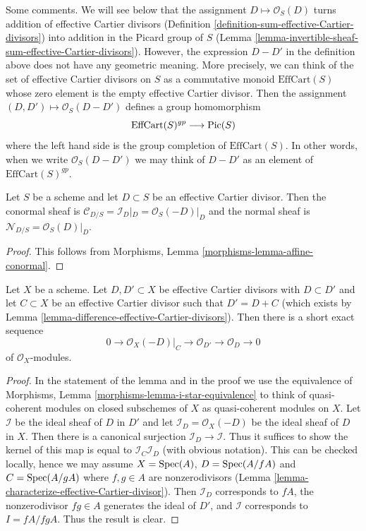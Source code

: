 \noindent
Some comments. We will see below that the assignment
$D \mapsto \mathcal{O}_S(D)$ turns addition of effective Cartier
divisors (Definition \ref{definition-sum-effective-Cartier-divisors})
into addition in the Picard group of $S$
(Lemma \ref{lemma-invertible-sheaf-sum-effective-Cartier-divisors}).
However, the expression $D - D'$ in the definition above does not
have any geometric meaning. More precisely, we can think of the
set of effective Cartier divisors on $S$ as a commutative monoid
$\text{EffCart}(S)$ whose zero element is the empty effective Cartier divisor.
Then the assignment $(D, D') \mapsto \mathcal{O}_S(D - D')$ defines
a group homomorphism
$$
\text{EffCart}(S)^{gp} \longrightarrow \mathop{\mathrm{Pic}}\nolimits(S)
$$
where the left hand side is the group completion of
$\text{EffCart}(S)$. In other words, when we write $\mathcal{O}_S(D - D')$
we may think of $D - D'$ as an element of $\text{EffCart}(S)^{gp}$.

\begin{lemma}
\label{lemma-conormal-effective-Cartier-divisor}
Let $S$ be a scheme and let $D \subset S$ be an effective Cartier divisor.
Then the conormal sheaf is $\mathcal{C}_{D/S} = \mathcal{I}_D|_D =
\mathcal{O}_S(-D)|_D$ and the normal sheaf is
$\mathcal{N}_{D/S} = \mathcal{O}_S(D)|_D$.
\end{lemma}

\begin{proof}
This follows from Morphisms, Lemma \ref{morphisms-lemma-affine-conormal}.
\end{proof}

\begin{lemma}
\label{lemma-ses-add-divisor}
Let $X$ be a scheme. Let $D, D' \subset X$ be effective Cartier divisors
with $D \subset D'$ and let $C \subset X$ be an effective Cartier divisor
such that $D' = D + C$ (which exists by
Lemma \ref{lemma-difference-effective-Cartier-divisors}).
Then there is a short exact sequence
$$
0 \to \mathcal{O}_X(-D)|_C \to \mathcal{O}_{D'} \to \mathcal{O}_D \to 0
$$
of $\mathcal{O}_X$-modules.
\end{lemma}

\begin{proof}
In the statement of the lemma and in the proof we use the equivalence of
Morphisms, Lemma \ref{morphisms-lemma-i-star-equivalence} to think of
quasi-coherent modules on closed subschemes of $X$
as quasi-coherent modules on $X$. Let $\mathcal{I}$ be the ideal
sheaf of $D$ in $D'$ and let $\mathcal{I}_D = \mathcal{O}_X(-D)$ be
the ideal sheaf of $D$ in $X$. Then there is a canonical surjection
$\mathcal{I}_D \to \mathcal{I}$.
Thus it suffices to show the kernel of this map is equal to
$\mathcal{I}_C\mathcal{I}_D$ (with obvious notation).
This can be checked locally, hence we may assume
$X = \mathop{\mathrm{Spec}}(A)$, $D = \mathop{\mathrm{Spec}}(A/fA)$ and $C = \mathop{\mathrm{Spec}}(A/gA)$ where
$f, g \in A$ are nonzerodivisors
(Lemma \ref{lemma-characterize-effective-Cartier-divisor}).
Then $\mathcal{I}_D$ corresponds to $fA$, the nonzerodivisor $fg \in A$
generates the ideal of $D'$, and $\mathcal{I}$ corresponds to $I = fA/fgA$.
Thus the result is clear.
\end{proof}

